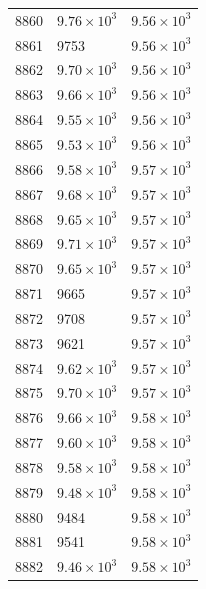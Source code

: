 \begin{table}[H]
\begin{tabular}{lll}
8860 & $\displaystyle 9.76 \times 10^{3}$ & $\displaystyle 9.56 \times 10^{3}$ \\
8861 & 9753 & $\displaystyle 9.56 \times 10^{3}$ \\
8862 & $\displaystyle 9.70 \times 10^{3}$ & $\displaystyle 9.56 \times 10^{3}$ \\
8863 & $\displaystyle 9.66 \times 10^{3}$ & $\displaystyle 9.56 \times 10^{3}$ \\
8864 & $\displaystyle 9.55 \times 10^{3}$ & $\displaystyle 9.56 \times 10^{3}$ \\
8865 & $\displaystyle 9.53 \times 10^{3}$ & $\displaystyle 9.56 \times 10^{3}$ \\
8866 & $\displaystyle 9.58 \times 10^{3}$ & $\displaystyle 9.57 \times 10^{3}$ \\
8867 & $\displaystyle 9.68 \times 10^{3}$ & $\displaystyle 9.57 \times 10^{3}$ \\
8868 & $\displaystyle 9.65 \times 10^{3}$ & $\displaystyle 9.57 \times 10^{3}$ \\
8869 & $\displaystyle 9.71 \times 10^{3}$ & $\displaystyle 9.57 \times 10^{3}$ \\
8870 & $\displaystyle 9.65 \times 10^{3}$ & $\displaystyle 9.57 \times 10^{3}$ \\
8871 & 9665 & $\displaystyle 9.57 \times 10^{3}$ \\
8872 & 9708 & $\displaystyle 9.57 \times 10^{3}$ \\
8873 & 9621 & $\displaystyle 9.57 \times 10^{3}$ \\
8874 & $\displaystyle 9.62 \times 10^{3}$ & $\displaystyle 9.57 \times 10^{3}$ \\
8875 & $\displaystyle 9.70 \times 10^{3}$ & $\displaystyle 9.57 \times 10^{3}$ \\
8876 & $\displaystyle 9.66 \times 10^{3}$ & $\displaystyle 9.58 \times 10^{3}$ \\
8877 & $\displaystyle 9.60 \times 10^{3}$ & $\displaystyle 9.58 \times 10^{3}$ \\
8878 & $\displaystyle 9.58 \times 10^{3}$ & $\displaystyle 9.58 \times 10^{3}$ \\
8879 & $\displaystyle 9.48 \times 10^{3}$ & $\displaystyle 9.58 \times 10^{3}$ \\
8880 & 9484 & $\displaystyle 9.58 \times 10^{3}$ \\
8881 & 9541 & $\displaystyle 9.58 \times 10^{3}$ \\
8882 & $\displaystyle 9.46 \times 10^{3}$ & $\displaystyle 9.58 \times 10^{3}$ \\

\end{tabular}
\end{table}
